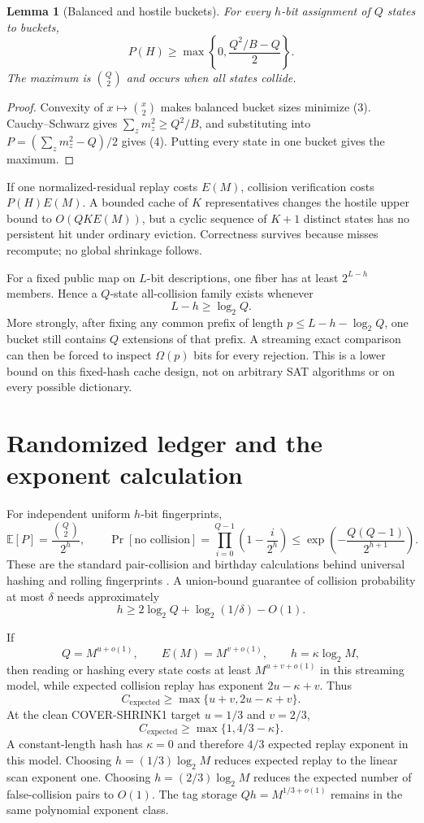 \documentclass[11pt]{article}
\newtheorem{lemma}[theorem]{Lemma}
\begin{document}
\begin{lemma}[Balanced and hostile buckets]
For every $h$-bit assignment of $Q$ states to buckets,
\[
 P(H)\ge
 \max\left\{0,\frac{Q^2/B-Q}{2}\right\}.
\tag{4}
\]
The maximum is $\binom Q2$ and occurs when all states collide.
\end{lemma}
\begin{proof}
Convexity of $x\mapsto\binom{x}{2}$ makes balanced bucket sizes minimize
(3).  Cauchy--Schwarz gives $\sum_zm_z^2\ge Q^2/B$, and substituting into
$P=(\sum_zm_z^2-Q)/2$ gives (4).  Putting every state in one bucket gives the
maximum.
\end{proof}

If one normalized-residual replay costs $E(M)$, collision verification costs
$P(H)E(M)$.  A bounded cache of $K$ representatives changes the hostile
upper bound to $O(QK E(M))$, but a cyclic sequence of $K+1$ distinct states
has no persistent hit under ordinary eviction.  Correctness survives because
misses recompute; no global shrinkage follows.

For a fixed public map on $L$-bit descriptions, one fiber has at least
$2^{L-h}$ members.  Hence a $Q$-state all-collision family exists whenever
\[
 L-h\ge\log_2Q.
\tag{5}
\]
More strongly, after fixing any common prefix of length
$p\le L-h-\log_2Q$, one bucket still contains $Q$ extensions of that prefix.
A streaming exact comparison can then be forced to inspect $\Omega(p)$ bits
for every rejection.  This is a lower bound on this fixed-hash cache design,
not on arbitrary SAT algorithms or on every possible dictionary.

\section{Randomized ledger and the exponent calculation}
For independent uniform $h$-bit fingerprints,
\[
 \mathbb E[P]=\frac{\binom Q2}{2^h},
\qquad
 \Pr[\text{no collision}]
 =\prod_{i=0}^{Q-1}\left(1-\frac{i}{2^h}\right)
 \le \exp\left(-\frac{Q(Q-1)}{2^{h+1}}\right).
\tag{6}
\]
These are the standard pair-collision and birthday calculations behind
universal hashing and rolling fingerprints \cite{carterwegman1979,karprabin1987}.
A union-bound guarantee of collision probability at most $\delta$ needs
approximately
\[
 h\ge2\log_2Q+\log_2(1/\delta)-O(1).
\tag{7}
\]

If
\[
 Q=M^{u+o(1)},\qquad E(M)=M^{v+o(1)},\qquad
 h=\kappa\log_2M,
\]
then reading or hashing every state costs at least $M^{u+v+o(1)}$ in this
streaming model, while expected collision replay has exponent
$2u-\kappa+v$.  Thus
\[
 C_{\mathrm{expected}}
 \ge\max\{u+v,2u-\kappa+v\}.
\tag{8}
\]
At the clean COVER-SHRINK1 target $u=1/3$ and $v=2/3$,
\[
 C_{\mathrm{expected}}\ge\max\{1,4/3-\kappa\}.
\tag{9}
\]
A constant-length hash has $\kappa=0$ and therefore $4/3$ expected replay
exponent in this model.  Choosing $h=(1/3)\log_2M$ reduces expected replay to
the linear scan exponent one.  Choosing $h=(2/3)\log_2M$ reduces the expected
number of false-collision pairs to $O(1)$.  The tag storage
$Qh=M^{1/3+o(1)}$ remains in the same polynomial exponent class.
\end{document}
